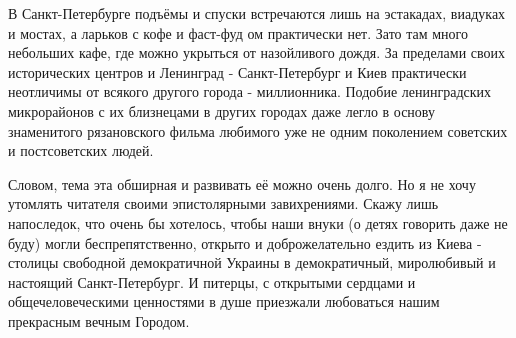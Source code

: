 В Санкт-Петербурге подъёмы и спуски встречаются лишь на эстакадах, виадуках и
мостах, а ларьков с кофе и фаст-фуд ом практически нет. Зато там много
небольших кафе, где можно укрыться от назойливого дождя. За пределами своих
исторических центров и Ленинград - Санкт-Петербург и Киев практически
неотличимы от всякого другого города - миллионника. Подобие ленинградских
микрорайонов с их близнецами в других городах даже легло в основу знаменитого
рязановского фильма любимого уже не одним поколением советских и постсоветских
людей. 

Словом, тема эта обширная и развивать её можно очень долго. Но я не хочу
утомлять читателя своими эпистолярными завихрениями. Скажу лишь напоследок, что
очень бы хотелось, чтобы наши внуки (о детях говорить даже не буду) могли
беспрепятственно, открыто и доброжелательно ездить из Киева - столицы свободной
демократичной Украины в демократичный, миролюбивый и настоящий Санкт-Петербург.
И питерцы, с открытыми сердцами и общечеловеческими ценностями в душе приезжали
любоваться нашим прекрасным вечным Городом.

